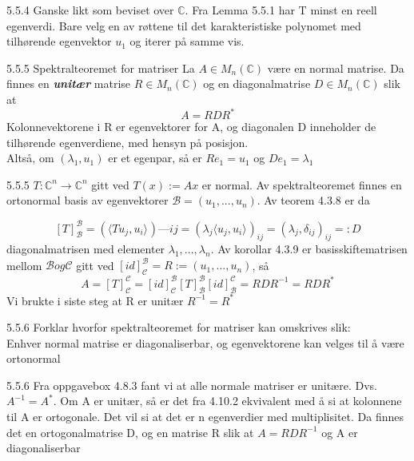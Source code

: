\documentclass[a4paper,norsk]{article}
\begin{document}
\begin{proofbox}{5.5.4}{}
Ganske likt som beviset over $ \mathbb{C} $. Fra Lemma 5.5.1 har T minst en reell egenverdi. Bare velg en av røttene til det karakteristiske polynomet med tilhørende egenvektor $ u_1 $ og iterer på samme vis. 
\end{proofbox}

\begin{corollarybox}{5.5.5 Spektralteoremet for matriser}{}
La $ A \in M_n (\mathbb{C}) $ være en normal matrise. Da finnes en \textbf{\textit{unitær}} matrise $ R \in M_n ( \mathbb{C}) $ og en diagonalmatrise $ D \in M_n( \mathbb{C}) $ slik at \[
    A = RDR^*
\]
Kolonnevektorene i R er egenvektorer for A, og diagonalen D inneholder de tilhørende egenverdiene, med hensyn på posisjon.\\

Altså, om $ \left( \lambda _1, u_1 \right)  $ er et egenpar, så er $ Re_1 = u_1 $ og $ De_1 = \lambda _1 $  
\end{corollarybox}

\begin{proofbox}{5.5.5}{}
$ T: \mathbb{C}^n \rightarrow \mathbb{C}^n $ gitt ved $ T(x) := Ax $ er normal. Av spektralteoremet finnes en ortonormal basis av egenvektorer $ \mathcal{B} = \left( u_1, ..., u_n \right)  $. Av teorem 4.3.8 er da 

\[
    \left[ T \right] _{ \mathcal{B}}^{ \mathcal{B}} = \left( \langle Tu_j, u_i \rangle_{  } \right)—{ij} = \left( \lambda _j \langle u_j, u_i \rangle_{  }  \right)_{ij} = \left( \lambda _j, \delta_{ij} \right)_{ij} =: D
\]
diagonalmatrisen med elementer $ \lambda _1, ..., \lambda _n $. Av korollar 4.3.9 er basisskiftematrisen mellom $ \mathcal{B} og \mathcal{C} $ gitt ved $ \left[ id \right] _{ \mathcal{C}}^{ \mathcal{B}} = R := \left( u_1, ..., u_n \right) $, så 
\[
    A = \left[ T \right] _{ \mathcal{C}}^{ \mathcal{C}} = \left[ id \right] _{ \mathcal{C}}^{ \mathcal{B}} \left[ T \right] _{ \mathcal{B}}^{ \mathcal{B}} \left[ id \right] _{ \mathcal{B}}^{ \mathcal{C}} = RDR^{-1} = RDR^*
\]
Vi brukte i siste steg at R er unitær $ R^{-1} = R^* $ 


\end{proofbox}

\begin{oppgavebox}{5.5.6}{}
Forklar hvorfor spektralteoremet for matriser kan omskrives slik:\\

Enhver normal matrise er diagonaliserbar, og egenvektorene kan velges til å være ortonormal

\begin{proofbox}{5.5.6}{}
Fra oppgavebox 4.8.3 fant vi at alle normale matriser er unitære. Dvs. $ A^{-1} = A^* $. Om A er unitær, så er det fra 4.10.2 ekvivalent med å si at kolonnene til A er ortogonale. Det vil si at det er n egenverdier med multiplisitet. Da finnes det en ortogonalmatrise D, og en matrise R slik at $ A = RDR^{-1} $ og A er diagonaliserbar 
\end{proofbox}
\end{oppgavebox}
\end{document}
